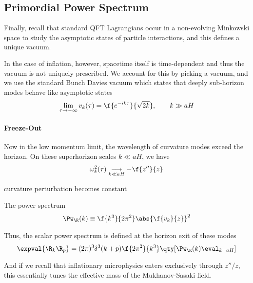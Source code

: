 

\subsection{Primordial Power Spectrum}

Finally, recall that standard QFT Lagrangians occur in a non-evolving Minkowski space to study the asymptotic states of particle interactions, and this defines a unique vacuum.

In the case of inflation, however, spacetime itself is time-dependent and thus the vacuum is not uniquely prescribed. We account for this by picking a vacuum, and we use the standard Bunch Davies vacuum which states that deeply sub-horizon modes behave like asymptotic states
\begin{equation}
    \lim_{\tau\to -\infty} v_k(\tau) = \f{e^{-ik\tau}}{\sqrt{2k}}, \qquad k\gg aH
\end{equation}

\paragraph{Freeze-Out}

Now in the low momentum limit, the wavelength of curvature modes exceed the horizon. On these superhorizon scales $k\ll aH$, we have 
\[
\omega_k^2(\tau)\underset{k\ll aH}{\longrightarrow} -\f{z''}{z}
\]

 curvature perturbation becomes constant

The power spectrum
\begin{equation}
    \Pw_\R(k)\equiv \f{k^3}{2\pi^2}\abs{\f{v_k}{z}}^2
\end{equation}

Thus, the scalar power spectrum is defined at the horizon exit of these modes
\begin{equation}
    \expval{\R_k\R_p}=(2\pi)^3\delta^3(k+p)\f{2\pi^2}{k^3}\qty[\Pw_\R(k)\eval_{k=aH}]
\end{equation}

And if we recall that inflationary microphysics enters exclusively through $z''/z$, this essentially tunes the effective mass of the Mukhanov-Sasaki field.

